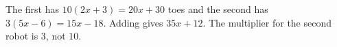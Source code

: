 The first has $10(2x+3)=20x+30$ toes and the second has $3(5x-6)=15x-18$. Adding gives $\boxed{35x+12}$. The multiplier for the second robot is $3$, not $10$.

